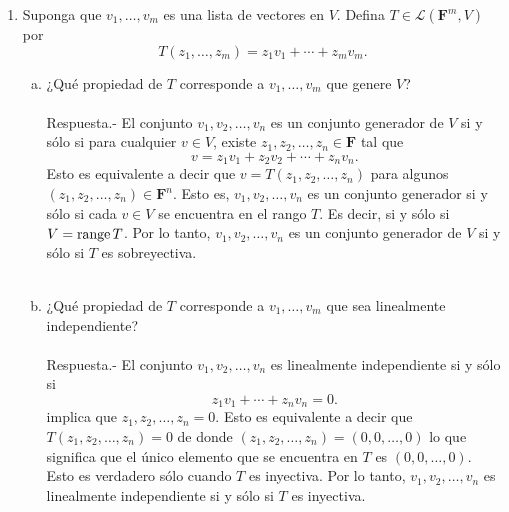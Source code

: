 \begin{enumerate}[\bfseries 1.]
    \item Suponga que $v_1,\ldots,v_m$ es una lista de vectores en $V$. Defina $T\in \mathcal{L}\left(\textbf{F}^m,V\right)$ por
    $$T(z_1,\ldots,z_m)=z_1v_1+\cdots+z_mv_m.$$
	
    \begin{enumerate}[(a)]

	\item ¿Qué propiedad de $T$ corresponde a $v_1,\ldots,v_m$ que genere $V$?\\\\
	    Respuesta.-\; El conjunto $v_1,v_2,\ldots,v_n$ es un conjunto generador de $V$ si y sólo si para cualquier $v\in V$, existe $z_1,z_2,\ldots,z_n\in \textbf{F}$ tal que 
	    $$v=z_1v_1+z_2v_2+\cdots+z_nv_n.$$
	    Esto es equivalente a decir que $v=T(z_1,z_2,\ldots,z_n)$ para algunos $(z_1,z_2,\ldots,z_n)\in \textbf{F}^n$. Esto es, $v_1,v_2,\ldots,v_n$ es un conjunto generador si y sólo si cada $v\in V$ se encuentra en el rango $T$. Es decir, si y sólo si $V=\operatorname{range} T$. Por lo tanto, $v_1,v_2,\ldots,v_n$ es un conjunto generador de $V$ si y sólo si $T$ es sobreyectiva.\\\\

	\item ¿Qué propiedad de $T$ corresponde a $v_1,\ldots,v_m$ que sea linealmente independiente?\\\\
	    Respuesta.-\; El conjunto $v_1,v_2,\ldots,v_n$ es linealmente independiente si y sólo si
	    $$z_1v_1+\cdots+z_nv_n = 0.$$
	    implica que $z_1,z_2,\ldots,z_n=0.$
	    Esto es equivalente a decir que $T(z_1,z_2,\ldots,z_n)=0$ de donde $(z_1,z_2,\ldots,z_n)=(0,0,\ldots,0)$ lo que significa  que el único elemento que se encuentra en $T$ es $(0,0,\ldots,0).$ Esto es verdadero sólo cuando $T$ es inyectiva. Por lo tanto, $v_1,v_2,\ldots,v_n$ es linealmente independiente si y sólo si $T$ es inyectiva.\\\\

    \end{enumerate}


\end{enumerate}
